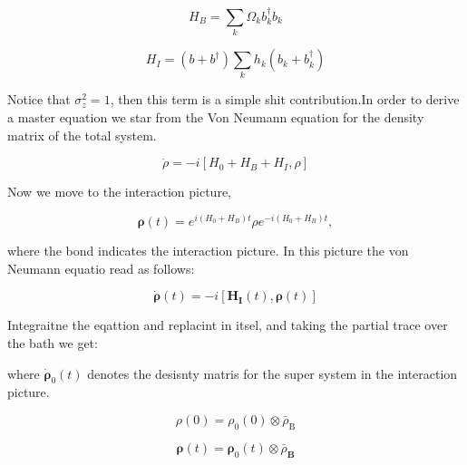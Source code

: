\documentclass[%
preprint,
onecolumn,
notitlepag,
 amsmath,amssymb,
 aps,
 pra,
]{revtex4-2}
\begin{document}
\begin{equation}
    H_B= \sum_{k} \Omega_k b_k ^{\dagger} b_k
\end{equation}    

\begin{equation}
    H_I= \left( b + b ^{\dagger} \right) \sum_k h_k \left( b_k + b_k ^{\dagger} \right)
\end{equation}

Notice that $\sigma_z^2= 1$, then this term is a simple shit contribution.In order to derive a master equation we star from the Von Neumann equation for the density matrix of the total system.

\begin{equation}
    \dot{\rho} = -i \left[ H_0 + H_B + H_I , \rho \right]
\end{equation}

Now we move to the interaction picture, 

\begin{equation}
  \boldsymbol{\rho}(t) = e^{i (H_0+H_B) t} \rho e^{-i (H_0+H_B) t},
\end{equation}

where the bond indicates the interaction picture. In this picture the von Neumann equatio read as follows:

\begin{equation}
  \dot{\boldsymbol{\rho}}(t) = -i \left[  \mathbf{H_I}(t) ,  \boldsymbol{\rho}(t)\right]
\end{equation}

Integraitne the eqattion and replacint in itsel, and taking the partial trace over the bath we get:


where  $\dot{\boldsymbol{\rho}}_0(t)$ denotes the desisnty matris for the  super system in the interaction picture. 

\begin{equation}
\rho(0)=\rho_{\mathrm{0}} (0) \otimes \bar{\rho}_{\mathrm{B}}
\end{equation}


\begin{equation}\boldsymbol{
\rho}(t)=\boldsymbol{\rho}_0(t) \otimes \bar{\rho}_{\mathbf{B}}
\end{equation}
\end{document}
